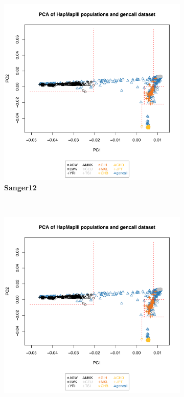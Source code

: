 \begin{figure}[!tbp]
	\centering
	\begin{subfigure}[b]{0.3\textwidth}
		\center
		\includegraphics[trim = 0mm 0mm 10mm 25mm, clip,scale=0.3,page=1]{FiguresTablesGenotypes/pca_overview_sanger12_singapore123.pdf}	
		\caption{\textbf{Sanger12}}
		\label{fig:pca1}	
	\end{subfigure}
	~
	\begin{subfigure}[b]{0.3\textwidth}
		\center
		\includegraphics[trim = 0mm 0mm 10mm 25mm, clip,scale=0.3, page=2]{FiguresTablesGenotypes/pca_overview_sanger12_singapore123.pdf}	

\end{subfigure}
\end{figure}
